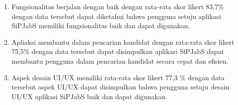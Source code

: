 \begin{enumerate}
	\item Fungsionalitas berjalan dengan baik dengan rata-rata skor likert 83,7\% dengan data tersebut dapat diketahui bahwa pengguna setuju aplikasi SiPJabS memiliki fungsionalitas baik dan dapat digunakan.
	
	\item Apliaksi membantu dalam pencarian kandidat dengan rata-rata skor likert  75,5\% dengan data tersebut dapat disimpulkan aplikasi SiPJabS dapat membantu pengguna dalam pencarian kandidat secara cepat dan efisien. 
	
	\item Aspek desain UI/UX memiliki rata-rata skor likert 77,3 \% dengan data tersebut aspek UI/UX dapat disimpulkan bahwa pengguna setuju desain UI/UX aplikasi SiPJabS baik dan dapat digunakan.
	
	
\end{enumerate} 
